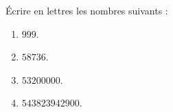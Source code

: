 \begin{exercice}{}{}
    Écrire en lettres les nombres suivants :
    \begin{enumerate}
       \item $\num{999}$.
       \item $\num{58736}$.
       \item $\num{53200000}$.
       \item $\num{543823942900}$.
    \end{enumerate}
\end{exercice}